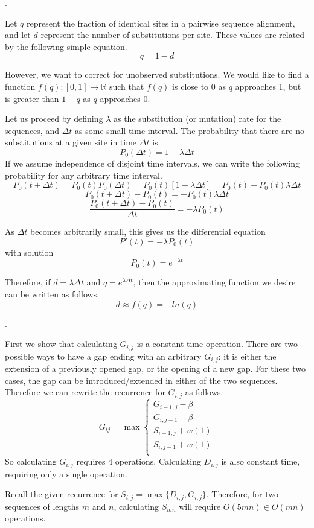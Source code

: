 \documentclass[a4paper, 10pt]{article}
\newcounter{prob_num}
\newcommand{\problem}{\vspace{20pt}\arabic{prob_num}.\stepcounter{prob_num}\par}
\begin{document}
\problem

Let $q$ represent the fraction of identical sites in a pairwise sequence alignment, and let $d$ represent the number of substitutions per site. These values are related by the following simple equation. \[ q = 1 - d \]

However, we want to correct for unobserved substitutions. We would like to find a function $f(q) : [0,1] \rightarrow \mathbb{R}$ such that $f(q)$ is close to 0 as $q$ approaches 1, but is greater than $1 - q$ as $q$ approaches 0.

Let us proceed by defining $\lambda$ as the substitution (or mutation) rate for the sequences, and $\Delta t$ as some small time interval. The probability that there are no substitutions at a given site in time $\Delta t$ is \[ P_0(\Delta t) = 1 - \lambda \Delta t \] If we assume independence of disjoint time intervals, we can write the following probability for any arbitrary time interval. \[ P_0(t + \Delta t) = P_0(t)P_0(\Delta t) = P_0(t)[1 - \lambda \Delta t] = P_0(t) - P_0(t)\lambda \Delta t \]
\[ P_0(t + \Delta t) - P_0(t) = - P_0(t)\lambda \Delta t \]
\[ \frac{P_0(t + \Delta t) - P_0(t)}{\Delta t} = - \lambda P_0(t) \]

As $\Delta t$ becomes arbitrarily small, this gives us the differential equation \[ P'(t) = -\lambda P_0(t) \] with solution \[ P_0(t) = e^{-\lambda t} \]

Therefore, if $d = \lambda \Delta t$ and $q = e^{\lambda \Delta t}$, then the approximating function we desire can be written as follows. \[ d \approx f(q) = -ln(q) \]


\problem
First we show that calculating $G_{i,j}$ is a constant time operation. There are two possible ways to have a gap ending with an arbitrary $G_{i,j}$: it is either the extension of a previously opened gap, or the opening of a new gap. For these two cases, the gap can be introduced/extended in either of the two sequences. Therefore we can rewrite the recurrence for $G_{i,j}$ as follows.
\[
G_{ij} = \max \left\{
  \begin{array}{l}
    G_{i-1,j} - \beta \\
    G_{i,j-1} - \beta \\
    S_{i-1,j} + w(1)  \\
    S_{i,j-1} + w(1)  \\
  \end{array}
  \right.
\]
So calculating $G_{i,j}$ requires 4 operations. Calculating $D_{i,j}$ is also constant time, requiring only a single operation.

Recall the given recurrence for $S_{i,j} = \max \{ D_{i,j}, G_{i,j} \}$. Therefore, for two sequences of lengths $m$ and $n$, calculating $S_{mn}$ will require $O(5mn) \in O(mn)$ operations.
\end{document}
